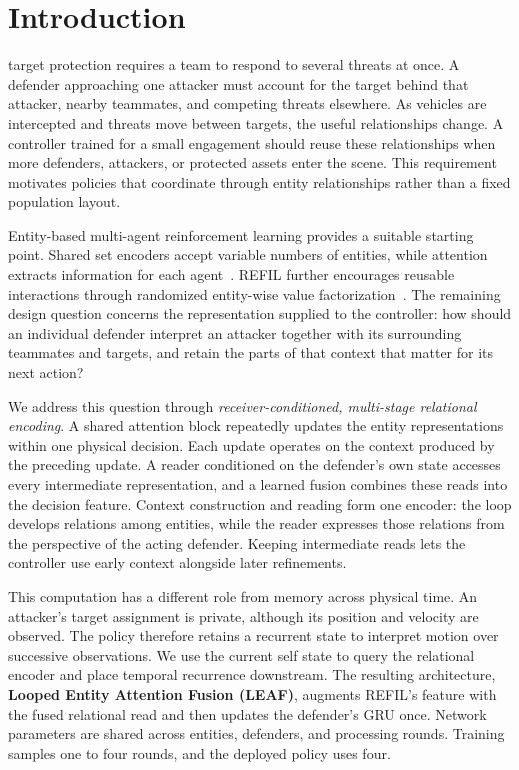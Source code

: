 \section{Introduction}
 target protection requires a team to respond to several threats at once. A defender approaching one attacker must account for the target behind that attacker, nearby teammates, and competing threats elsewhere. As vehicles are intercepted and threats move between targets, the useful relationships change. A controller trained for a small engagement should reuse these relationships when more defenders, attackers, or protected assets enter the scene. This requirement motivates policies that coordinate through entity relationships rather than a fixed population layout.

Entity-based multi-agent reinforcement learning provides a suitable starting point. Shared set encoders accept variable numbers of entities, while attention extracts information for each agent~\cite{zaheer2017deepsets,lee2019settransformer}. REFIL further encourages reusable interactions through randomized entity-wise value factorization~\cite{iqbal2021refil}. The remaining design question concerns the representation supplied to the controller: how should an individual defender interpret an attacker together with its surrounding teammates and targets, and retain the parts of that context that matter for its next action?

We address this question through \emph{receiver-conditioned, multi-stage relational encoding}. A shared attention block repeatedly updates the entity representations within one physical decision. Each update operates on the context produced by the preceding update. A reader conditioned on the defender's own state accesses every intermediate representation, and a learned fusion combines these reads into the decision feature. Context construction and reading form one encoder: the loop develops relations among entities, while the reader expresses those relations from the perspective of the acting defender. Keeping intermediate reads lets the controller use early context alongside later refinements.

This computation has a different role from memory across physical time. An attacker's target assignment is private, although its position and velocity are observed. The policy therefore retains a recurrent state to interpret motion over successive observations. We use the current self state to query the relational encoder and place temporal recurrence downstream. The resulting architecture, \textbf{Looped Entity Attention Fusion (LEAF)}, augments REFIL's feature with the fused relational read and then updates the defender's GRU once. Network parameters are shared across entities, defenders, and processing rounds. Training samples one to four rounds, and the deployed policy uses four.

